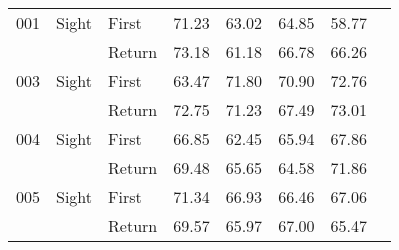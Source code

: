 \begin{table}[!htb]
\begin{tabular}{lllrrrrr}
001 & Sight & First &  71.23 &                                                 63.02 &                                                  64.85 &   58.77 \\
    &       & Return &  73.18 &                                                 61.18 &                                                  66.78 &   66.26 \\
003 & Sight & First &  63.47 &                                                 71.80 &                                                  70.90 &   72.76 \\
    &       & Return &  72.75 &                                                 71.23 &                                                  67.49 &   73.01 \\
004 & Sight & First &  66.85 &                                                 62.45 &                                                  65.94 &   67.86 \\
    &       & Return &  69.48 &                                                 65.65 &                                                  64.58 &   71.86 \\
005 & Sight & First &  71.34 &                                                 66.93 &                                                  66.46 &   67.06 \\
    &       & Return &  69.57 &                                                 65.97 &                                                  67.00 &   65.47 \\
\bottomrule
\end{tabular}
\end{table}

